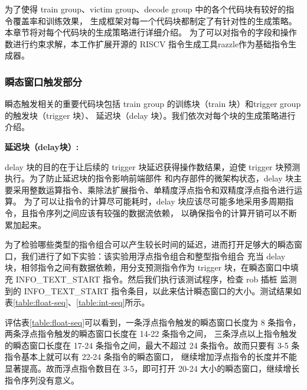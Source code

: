 为了使得 train group、victim group、decode group 中的各个代码块有较好的指令覆盖率和训练效果，
生成框架对每一个代码块都制定了有针对性的生成策略。本章节将对每个代码块的生成策略进行详细介绍。
为了可以对指令的字段和操作数进行约束求解，本工作扩展开源的 RISCV 指令生成工具razzle\cite{razzle}作为基础指令生成器。

\subsubsection{瞬态窗口触发部分}

瞬态触发相关的重要代码块包括 train group 的训练块（train 块）和trigger group 的触发块（trigger 块）、
延迟块（delay 块）。我们依次对每个块的生成策略进行介绍。\par

\textbf{延迟块（delay块）:}\par
delay 块的目的在于让后续的 trigger 块延迟获得操作数结果，迫使 trigger 块预测执行。为了防止延迟块的指令影响前端部件
和内存部件的微架构状态，delay 块主要采用整数运算指令、乘除法扩展指令、单精度浮点指令和双精度浮点指令进行运算。
为了可以让指令的计算尽可能耗时，delay 块应该尽可能多地采用多周期指令，且指令序列之间应该有较强的数据流依赖，
以确保指令的计算开销可以不断累加起来。\par

为了检验哪些类型的指令组合可以产生较长时间的延迟，进而打开足够大的瞬态窗口，我们进行了如下实验：该实验用浮点指令组合和整型指令组合
充当 delay 块，相邻指令之间有数据依赖，用分支预测指令作为 trigger 块，在瞬态窗口中填充 INFO\_TEXT\_START 指令。然后我们执行该测试程序，检查 rob 插桩
监测到的 INFO\_TEXT\_START 指令条目，以此来估计瞬态窗口的大小。测试结果如表\ref{table:float-seq}、\ref{table:int-seq}所示。\par

评估表\ref{table:float-seq}可以看到，一条浮点指令触发的瞬态窗口长度为 8 条指令，两条浮点指令触发的瞬态窗口长度在 14-22 条指令之间，
三条浮点以上指令触发的瞬态窗口长度在 17-24 条指令之间，最大不超过 24 条指令。故而只要有 3-5 条指令基本上就可以有 22-24 条指令的瞬态窗口，
继续增加浮点指令的长度并不能显著提高。故而浮点指令数目在 3-5，即可打开 20-24 大小的瞬态窗口，继续增长指令序列没有意义。\par

